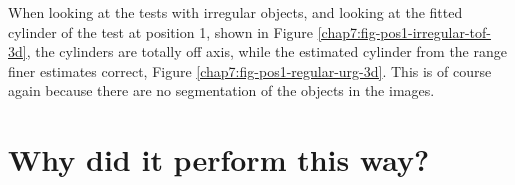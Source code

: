 When looking at the tests with irregular objects, and looking at the fitted cylinder of
the test at position 1, shown in Figure \ref{chap7:fig-pos1-irregular-tof-3d}, the
cylinders are totally off axis, while the estimated cylinder from the range finer
estimates correct, Figure \ref{chap7:fig-pos1-regular-urg-3d}. This is of course again
because there are no segmentation of the objects in the images. 




\section{Why did it perform this way?}



